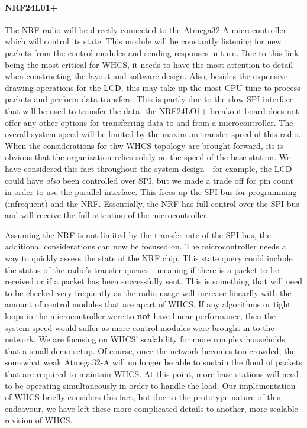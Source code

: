 \paragraph{NRF24L01+}
The NRF radio will be directly connected to the Atmega32-A microcontroller
which will control its state. This module will be constantly listening for new
packets from the control modules and sending responses in turn. Due to this
link being the most critical for WHCS, it needs to have the most attention to
detail when constructing the layout and software design. Also, besides the
expensive drawing operations for the LCD, this may take up the most CPU time to
process packets and perform data transfers. This is partly due to the slow SPI
interface that will be used to transfer the data. the NRF24LO1+ breakout board
does not offer any other options for transferring data to and from a
microcontroller. The overall system speed will be limited by the maximum
transfer speed of this radio. When the considerations for thw WHCS topology are
brought forward, its is obvious that the organization relies solely on the
speed of the base station. We have considered this fact throughout the system
design - for example, the LCD could have \emph{also} been controlled over SPI,
but we made a trade off for pin count in order to use the parallel interface.
This frees up the SPI bus for programming (infrequent) and the NRF.
Essentially, the NRF has full control over the SPI bus and will receive the
full attention of the microcontroller. 

Assuming the NRF is not limited by the transfer rate of the SPI bus, the
additional considerations can now be focused on. The microcontroller needs a
way to quickly assess the state of the NRF chip. This state query could include
the status of the radio's transfer queues - meaning if there is a packet to be
received or if a packet has been successfully sent. This is something that will
need to be checked very frequently as the radio usage will increase linearlly
with the amount of control modules that are apart of WHCS. If any algorithms or
tight loops in the microcontroller were to \textbf{not} have linear
performance, then the system speed would suffer as more control modules were
brought in to the network. We are focusing on WHCS' scalability for more
complex households that a small demo setup. Of course, once the network becomes
too crowded, the somewhat weak Atmega32-A will no longer be able to sustain the
flood of packets that are required to maintain WHCS. At this point, more base
stations will need to be operating simultaneously in order to handle the load.
Our implementation of WHCS briefly considers this fact, but due to the
prototype nature of this endeavour, we have left these more complicated details
to another, more scalable revision of WHCS.


